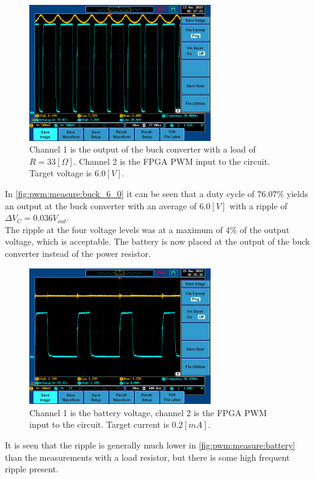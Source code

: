 \documentclass[../report.tex]{subfiles}
\begin{document}
\begin{figure}[H]
    \centering
         \includegraphics[width=0.7\textwidth]{figures/measurements/6_0_V_BOTH_PWRES.PNG}
     \caption{Channel 1 is the output of the buck converter with a load of $R = 33 [\Omega]$. Channel 2 is the FPGA PWM input to the circuit. Target voltage is $6.0[V]$.}
     \label{fig:pwm:measure:buck_6_0}
\end{figure}
In \autoref{fig:pwm:measure:buck_6_0} it can be seen that a duty cycle of $76.07 \%$ yields an output at the buck converter with an average of $6.0 [V]$ with a ripple of $\Delta V_C = 0.036 V_{out}$.\\
The ripple at the four voltage levels was at a maximum of $4 \%$ of the output voltage, which is acceptable. The battery is now placed at the output of the buck converter instead of the power resistor. 
\begin{figure}[H]
    \centering
         \includegraphics[width=0.7\textwidth]{figures/measurements/BATTERY_MEASURE.PNG}
     \caption{Channel 1 is the battery voltage, channel 2 is the FPGA PWM input to the circuit. Target current is $0.2[mA]$.}
     \label{fig:pwm:measure:battery}
\end{figure}
It is seen that the ripple is generally much lower in \autoref{fig:pwm:measure:battery} than the measurements with a load resistor, but there is some high frequent ripple present.
\end{document}
